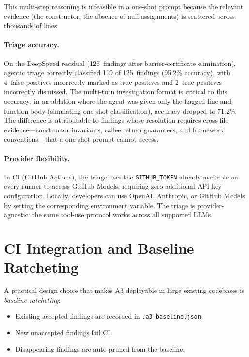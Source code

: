 \documentclass[sigconf,review,anonymous]{acmart}
\begin{document}
This multi-step reasoning is infeasible in a one-shot prompt because the relevant evidence (the constructor, the absence of null assignments) is scattered across thousands of lines.

\paragraph{Triage accuracy.}
On the DeepSpeed residual (125~findings after barrier-certificate elimination), agentic triage correctly classified 119 of 125~findings (95.2\% accuracy), with 4~false positives incorrectly marked as true positives and 2~true positives incorrectly dismissed.
The multi-turn investigation format is critical to this accuracy: in an ablation where the agent was given only the flagged line and function body (simulating one-shot classification), accuracy dropped to 71.2\%.
The difference is attributable to findings whose resolution requires cross-file evidence---constructor invariants, callee return guarantees, and framework conventions---that a one-shot prompt cannot access.

\paragraph{Provider flexibility.}
In CI (GitHub Actions), the triage uses the \texttt{GITHUB\_TOKEN} already available on every runner to access GitHub Models, requiring zero additional API key configuration.
Locally, developers can use OpenAI, Anthropic, or GitHub Models by setting the corresponding environment variable.
The triage is provider-agnostic: the same tool-use protocol works across all supported LLMs.

\section{CI Integration and Baseline Ratcheting}\label{sec:ci}

A practical design choice that makes \textsc{A3} deployable in large existing codebases is \emph{baseline ratcheting}:
\begin{itemize}
  \item Existing accepted findings are recorded in \texttt{.a3-baseline.json}.
  \item New unaccepted findings fail CI.
  \item Disappearing findings are auto-pruned from the baseline.
\end{itemize}
\end{document}
